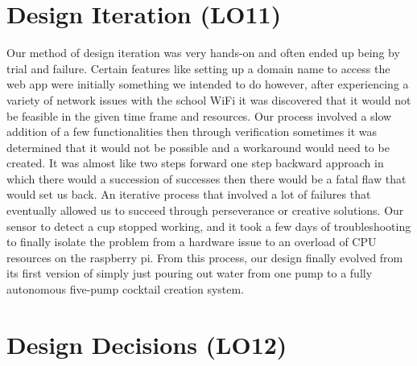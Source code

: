 \documentclass{article}
\begin{document}
\section{Design Iteration (LO11)}
Our method of design iteration was very hands-on and often ended up being by trial and failure. Certain features like setting up a domain name to access the web app were initially something we intended to do however, after experiencing a variety of network issues with the school WiFi it was discovered that it would not be feasible in the given time frame and resources. Our process involved a slow addition of a few functionalities then through verification sometimes it was determined that it would not be possible and a workaround would need to be created. It was almost like two steps forward one step backward approach in which there would a succession of successes then there would be a fatal flaw that would set us back. An iterative process that involved a lot of failures that eventually allowed us to succeed through perseverance or creative solutions. Our sensor to detect a cup stopped working, and it took a few days of troubleshooting to finally isolate the problem from a hardware issue to an overload of CPU resources on the raspberry pi. From this process, our design finally evolved from its first version of simply just pouring out water from one pump to a fully autonomous five-pump cocktail creation system. 

\section{Design Decisions (LO12)}
\end{document}
